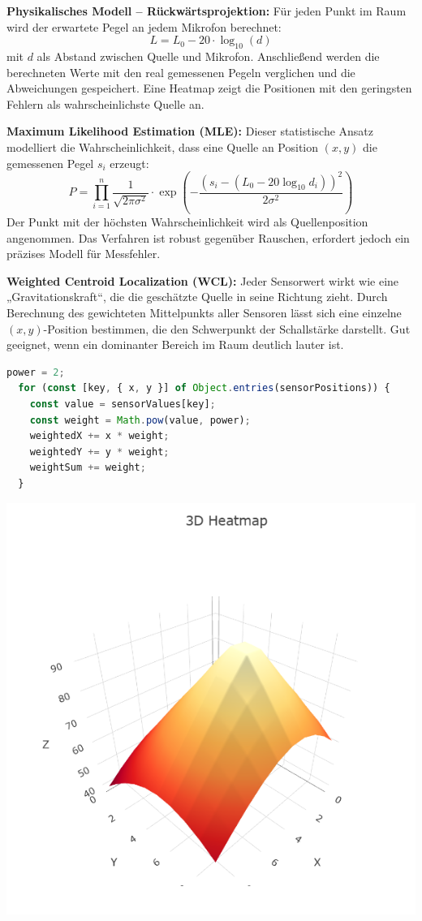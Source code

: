 \textbf{Physikalisches Modell – Rückwärtsprojektion:}  
Für jeden Punkt im Raum wird der erwartete Pegel an jedem Mikrofon berechnet:
\[
L = L_0 - 20 \cdot \log_{10}(d)
\]
mit $d$ als Abstand zwischen Quelle und Mikrofon. Anschließend werden die berechneten Werte mit den real gemessenen Pegeln verglichen und die Abweichungen gespeichert. Eine Heatmap zeigt die Positionen mit den geringsten Fehlern als wahrscheinlichste Quelle an.

\textbf{Maximum Likelihood Estimation (MLE):}  
Dieser statistische Ansatz modelliert die Wahrscheinlichkeit, dass eine Quelle an Position $(x, y)$ die gemessenen Pegel $s_i$ erzeugt:
\[
P = \prod_{i=1}^{n} \frac{1}{\sqrt{2\pi\sigma^2}} \cdot
\exp\left(-\frac{(s_i - (L_0 - 20\log_{10} d_i))^2}{2\sigma^2}\right)
\]
Der Punkt mit der höchsten Wahrscheinlichkeit wird als Quellenposition angenommen. Das Verfahren ist robust gegenüber Rauschen, erfordert jedoch ein präzises Modell für Messfehler.

\textbf{Weighted Centroid Localization (WCL):}  
Jeder Sensorwert wirkt wie eine „Gravitationskraft“, die die geschätzte Quelle in seine Richtung zieht. Durch Berechnung des gewichteten Mittelpunkts aller Sensoren lässt sich eine einzelne $(x,y)$-Position bestimmen, die den Schwerpunkt der Schallstärke darstellt. Gut geeignet, wenn ein dominanter Bereich im Raum deutlich lauter ist.
\begin{lstlisting}[language=JavaScript, caption={Weighted Centroid Localization (WCL)}]
	power = 2;    
  for (const [key, { x, y }] of Object.entries(sensorPositions)) {
    const value = sensorValues[key];
    const weight = Math.pow(value, power);
    weightedX += x * weight;
    weightedY += y * weight;
    weightSum += weight;
  }
\end{lstlisting}
\begin{minipage}[b]{0.5\textwidth}
  \includegraphics[width=\textwidth]{../images/Heatmap/WCLHeatmap.png}
\end{minipage}

